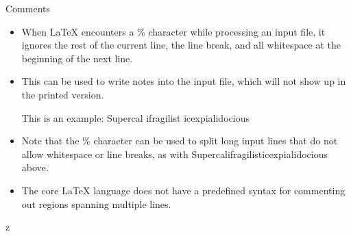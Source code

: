 \documentclass[style=lsuloni,orient=landscape]{powerdot}
\begin{document}
\begin{wideslide}[bm={Comments},method=direct]{Comments}
  \begin{itemize}
  \item When LaTeX encounters a \% character while processing an input file, it ignores the rest of the current line, the line break, and all whitespace at the beginning of the next line.
  \item This can be used to write notes into the input file, which will not show up in the printed version.
    \begin{LTXexample}[numbers=none,pos=b,showspaces=true]
This is an %
example: Supercal%
            ifragilist%
icexpialidocious
    \end{LTXexample}
  \item Note that the \% character can be used to split long input lines that do not allow whitespace or line breaks, as with Supercalifragilisticexpialidocious above.
  \item The core LaTeX language does not have a predefined syntax for commenting out regions spanning multiple lines.
  \end{itemize}	
\end{wideslide}
z
\end{document}
